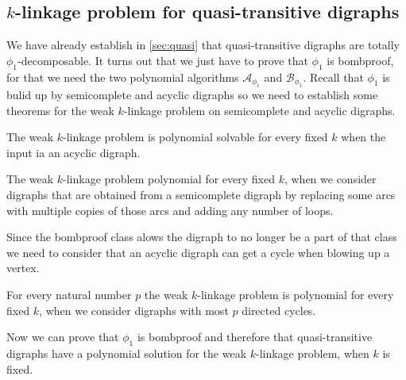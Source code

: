 \subsection{$k$-linkage problem for quasi-transitive digraphs}
We have already establish in \autoref{sec:quasi} that quasi-transitive digraphs are totally $\phi_1$-decomposable.
It turns out that we just have to prove that $\phi_1$ is bombproof, for that we need the two polynomial algorithms $\mathcal{A}_{\phi_1}$ and $\mathcal{B}_{\phi_1}$. Recall that $\phi_1$ is bulid up by semicomplete and acyclic digraphs so we need to establish some theorems for the weak $k$-linkage problem on semicomplete and acyclic digraphs.
\begin{thm}
    The weak $k$-linkage problem is polynomial solvable for every fixed $k$ when the input ia an acyclic digraph.
\end{thm}
\begin{thm}
    The weak $k$-linkage problem polynomial for every fixed $k$, when we consider digraphs that are obtained from a semicomplete digraph by replacing some arcs with multiple copies of those arcs and adding any number of loops.
\end{thm}

Since the bombproof class alows the digraph to no longer be a part of that class we need to consider that an acyclic digraph can get a cycle when blowing up a vertex. 
\begin{thm}
    For every natural number $p$ the weak $k$-linkage problem is polynomial for every fixed $k$, when we consider digraphs with most $p$ directed cycles.
    \label{thm:cycleklink}
\end{thm}

Now we can prove that $\phi_1$ is bombproof and therefore that quasi-transitive digraphs have a polynomial solution for the weak $k$-linkage problem, when $k$ is fixed.

